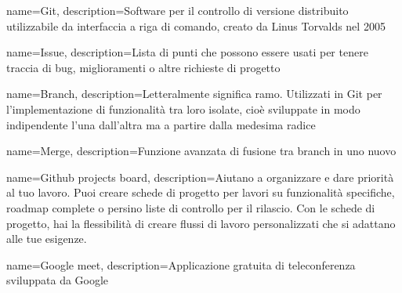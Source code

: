 {
	name={Git},
	description={Software per il controllo di versione distribuito utilizzabile da interfaccia a riga di comando, creato da Linus Torvalds nel 2005}
}

{
	name={Issue},
	description={Lista di punti che possono essere usati per tenere traccia di bug, miglioramenti o altre richieste di progetto}
}

{
	name={Branch},
	description={Letteralmente significa ramo. Utilizzati in Git per l'implementazione di funzionalità tra loro isolate, cioè sviluppate in modo indipendente l'una dall'altra ma a partire dalla medesima radice}
}

{
	name={Merge},
	description={Funzione avanzata di fusione tra branch in uno nuovo}
}

{
	name={Github projects board},
	description={Aiutano a organizzare e dare priorità al tuo lavoro. Puoi creare schede di progetto per lavori su funzionalità specifiche, roadmap complete o persino liste di controllo per il rilascio. Con le schede di progetto, hai la flessibilità di creare flussi di lavoro personalizzati che si adattano alle tue esigenze.}
}

{
	name={Google meet},
	description={Applicazione gratuita di teleconferenza sviluppata da Google}
}